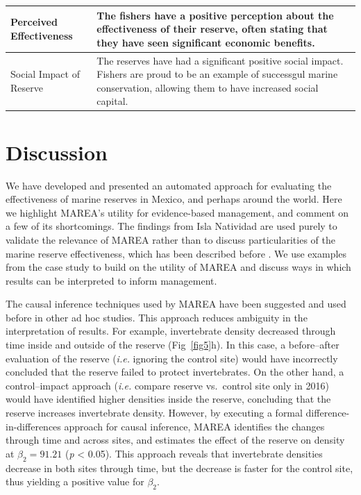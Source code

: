 \documentclass[10pt,letterpaper]{article}
\begin{document}
\begin{table}[!ht]
\begin{adjustwidth}{-2.25in}{0in}
\begin{tabular}{l|>{\raggedright\arraybackslash}p{9cm}}
\hline
Perceived Effectiveness & The fishers have a positive perception about the effectiveness of their reserve, often stating that they have seen significant economic benefits.\\
\hline
Social Impact of Reserve & The reserves have had a significant positive social impact. Fishers are proud to be an example of successgul marine conservation, allowing them to have increased social capital.\\
\hline
\end{tabular}
\label{table5}
\end{adjustwidth}
\end{table}

\section*{Discussion}\label{discussion}

We have developed and presented an automated approach for evaluating the effectiveness of marine reserves in Mexico, and perhaps around the world. Here we highlight MAREA's utility for evidence-based management, and comment on a few of its shortcomings. The findings from Isla Natividad are used purely to validate the relevance of MAREA rather than to discuss particularities of the marine reserve effectiveness, which has been described before \cite{micheli_2012-EU,rossetto_2015-V0,munguavega_2015-yg}. We use examples from the case study to build on the utility of MAREA and discuss ways in which results can be interpreted to inform management.

The causal inference techniques used by MAREA have been suggested \cite{burgess_2018-HN,ferraro_2006-oW} and used \cite{moland_2013-VP} before in other ad hoc studies. This approach reduces ambiguity in the interpretation of results. For example, invertebrate density decreased through time inside and outside of the reserve (Fig~\ref{fig5}h). In this case, a before--after evaluation of the reserve (\emph{i.e.} ignoring the control site) would have incorrectly concluded that the reserve failed to protect invertebrates. On the other hand, a control--impact approach (\emph{i.e.} compare reserve vs.~control site only in 2016) would have identified higher densities inside the reserve, concluding that the reserve increases invertebrate density. However, by executing a formal difference-in-differences approach for causal inference, MAREA identifies the changes through time and across sites, and estimates the effect of the reserve on density at \(\beta_2 = 91.21\) (\emph{p} \textless{} 0.05). This approach reveals that invertebrate densities decrease in both sites through time, but the decrease is faster for the control site, thus yielding a positive value for \(\beta_2\).
\end{document}
